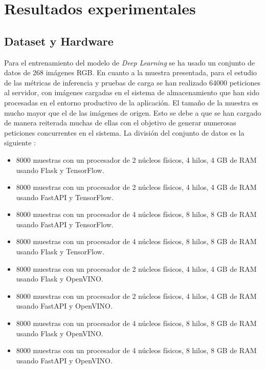 \mbox{}


\chapter{Resultados experimentales}
\label{ch:chapte5}


\section{Dataset y Hardware}\label{sec:dataset-usado}
Para el entrenamiento del modelo de \textit{Deep Learning} se ha usado un conjunto de datos de 268 imágenes RGB\@.
En cuanto a la muestra presentada, para el estudio de las métricas de inferencia y pruebas de carga se han realizado 64000 peticiones al servidor, con imágenes cargadas en el sistema de almacenamiento que han sido procesadas en el entorno productivo de la aplicación.
El tamaño de la muestra es mucho mayor que el de las imágenes de origen.
Esto se debe a que se han cargado de manera reiterada muchas de ellas con el objetivo de generar numerosas peticiones concurrentes en el sistema. La división del conjunto de datos es la siguiente :
\begin{itemize}
    \item 8000 muestras con un procesador de 2 núcleos físicos, 4 hilos, 4 GB de RAM usando Flask y TensorFlow.
    \item 8000 muestras con un procesador de 2 núcleos físicos, 4 hilos, 4 GB de RAM usando FastAPI y TensorFlow.
    \item 8000 muestras con un procesador de 4 núcleos físicos, 8 hilos, 8 GB de RAM usando FastAPI y TensorFlow.
    \item 8000 muestras con un procesador de 4 núcleos físicos, 8 hilos, 8 GB de RAM usando Flask y TensorFlow.
    \item 8000 muestras con un procesador de 2 núcleos físicos, 4 hilos, 4 GB de RAM usando Flask y OpenVINO\@.
    \item 8000 muestras con un procesador de 2 núcleos físicos, 4 hilos, 4 GB de RAM usando FastAPI y OpenVINO\@.
    \item 8000 muestras con un procesador de 4 núcleos físicos, 8 hilos, 8 GB de RAM usando Flask y OpenVINO\@.
    \item 8000 muestras con un procesador de 4 núcleos físicos, 8 hilos, 8 GB de RAM usando FastAPI y OpenVINO\@.
\end{itemize}

